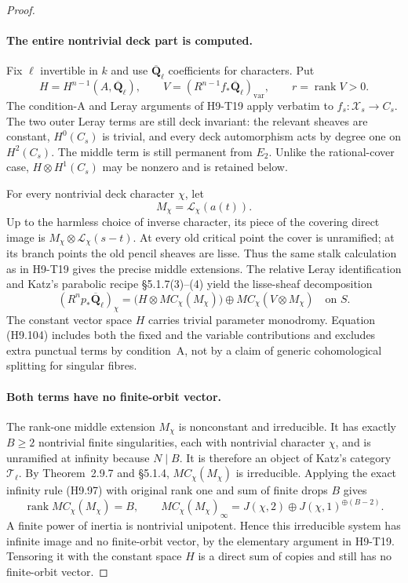 \begin{proof}
\paragraph{The entire nontrivial deck part is computed.}
Fix $\ell$ invertible in $k$ and use
$\overline{\mathbf Q}_\ell$ coefficients for characters.
Put
\[
 H=H^{n-1}(A,\overline{\mathbf Q}_\ell),\qquad
 V=(R^{n-1}f_*\overline{\mathbf Q}_\ell)_{\mathrm{var}},
 \qquad r=\operatorname{rank}V>0.
\]
The condition-A and Leray arguments of H9-T19 apply verbatim
to $f_s:\mathcal X_s\to C_s$. The two outer Leray terms
are still deck invariant: the relevant sheaves are constant,
$H^0(C_s)$ is trivial, and every deck automorphism acts by
degree one on $H^2(C_s)$. The middle term is still permanent
from $E_2$. Unlike the rational-cover case,
$H\otimes H^1(C_s)$ may be nonzero and is retained below.

For every nontrivial deck character $\chi$, let
\[
                       M_\chi=\mathcal L_\chi(a(t)).
\]
Up to the harmless choice of inverse character, its piece
of the covering direct image is
$M_\chi\otimes\mathcal L_\chi(s-t)$.
At every old critical point the cover is unramified; at its
branch points the old pencil sheaves are lisse. Thus the
same stalk calculation as in H9-T19 gives the precise middle
extensions. The relative Leray identification and Katz's
parabolic recipe \S5.1.7(3)--(4) yield the lisse-sheaf
decomposition
\[
 (R^n p_*\overline{\mathbf Q}_\ell)_\chi
       =\bigl(H\otimes MC_\chi(M_\chi)\bigr)
                 \oplus MC_\chi(V\otimes M_\chi)
                         \quad\text{on }S.                 \tag{H9.104}
\]
The constant vector space $H$ carries trivial parameter
monodromy. Equation (H9.104) includes both the fixed and the
variable contributions and excludes extra punctual terms
by condition~A, not by a claim of generic cohomological
splitting for singular fibres.

\paragraph{Both terms have no finite-orbit vector.}
The rank-one middle extension $M_\chi$ is nonconstant and
irreducible. It has exactly $B\ge2$ nontrivial finite
singularities, each with nontrivial character $\chi$, and
is unramified at infinity because $N\mid B$. It is therefore
an object of Katz's category $\mathcal T_\ell$. By
Theorem~2.9.7 and \S5.1.4, $MC_\chi(M_\chi)$ is irreducible.
Applying the exact infinity rule (H9.97) with original rank
one and sum of finite drops $B$ gives
\[
 \operatorname{rank}MC_\chi(M_\chi)=B,\qquad
 MC_\chi(M_\chi)_\infty
           =J(\chi,2)\oplus J(\chi,1)^{\oplus(B-2)}.
                                                               \tag{H9.105}
\]
A finite power of inertia is nontrivial unipotent. Hence this
irreducible system has infinite image and no finite-orbit
vector, by the elementary argument in H9-T19. Tensoring it
with the constant space $H$ is a direct sum of copies and
still has no finite-orbit vector.


\end{proof}
